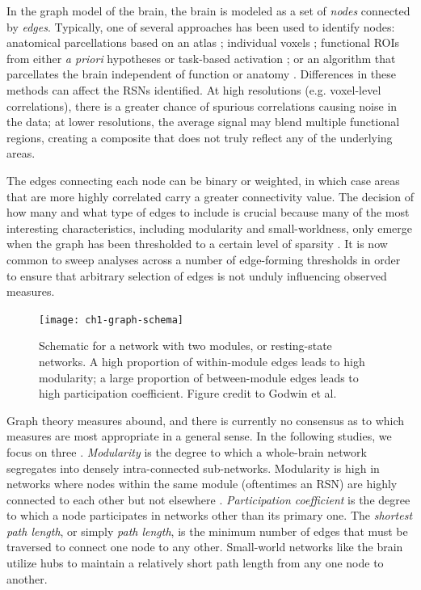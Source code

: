 In the graph model of the brain, the brain is modeled as a set of \textit{nodes} connected by \textit{edges}. Typically, one of several approaches has been used to identify nodes: anatomical parcellations based on an atlas \citep{Supekar2008, Liu2008, Lynall2010}; individual voxels \citep{Fair2007}; functional ROIs from either \textit{a priori} hypotheses or task-based activation \citep{VandenHeuvel2010}; or an algorithm that parcellates the brain independent of function or anatomy \citep{Goni2014}. Differences in these methods can affect the RSNs identified. At high resolutions (e.g. voxel-level correlations), there is a greater chance of spurious correlations causing noise in the data; at lower resolutions, the average signal may blend multiple functional regions, creating a composite that does not truly reflect any of the underlying areas. 

The edges connecting each node can be binary or weighted, in which case areas that are more highly correlated carry a greater connectivity value. The decision of how many and what type of edges to include is crucial because many of the most interesting characteristics, including modularity and small-worldness, only emerge when the graph has been thresholded to a certain level of sparsity \citep{Moussa2012}. It is now common to sweep analyses across a number of edge-forming thresholds in order to ensure that arbitrary selection of edges is not unduly influencing observed measures.

\begin{figure}[t]
    \centering
    \texttt{[image: ch1-graph-schema]}
    \caption[Schematic for a network with two modules]{Schematic for a network with two modules, or resting-state networks. A high proportion of within-module edges leads to high modularity; a large proportion of between-module edges leads to high participation coefficient. Figure credit to Godwin et al. \citep{Godwin2016}}
    \label{fig:ch1-graph-schema}
\end{figure}

Graph theory measures abound, and there is currently no consensus as to which measures are most appropriate in a general sense. In the following studies, we focus on three \citep{Rubinov2010}. \textit{Modularity} is the degree to which a whole-brain network segregates into densely intra-connected sub-networks. Modularity is high in networks where nodes within the same module (oftentimes an RSN) are highly connected to each other but not elsewhere \citep{Sporns2013}. \textit{Participation coefficient} is the degree to which a node participates in networks other than its primary one. The \textit{shortest path length}, or simply \textit{path length}, is the minimum number of edges that must be traversed to connect one node to any other. Small-world networks like the brain utilize hubs to maintain a relatively short path length from any one node to another. 

